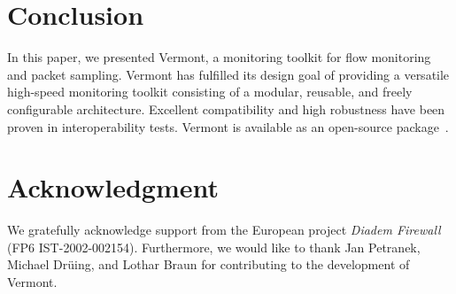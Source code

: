 

\section{Conclusion}
\label{sec:conclusion}

In this paper, we presented Vermont, a monitoring toolkit for flow monitoring and packet sampling.
Vermont has fulfilled its design goal of providing a versatile high-speed monitoring toolkit consisting of a modular, reusable, and freely configurable architecture. Excellent compatibility and high robustness have been proven in interoperability tests.
Vermont is available as an open-source package~\cite{vermont-site}.


\section*{Acknowledgment}
We gratefully acknowledge support from the European project \emph{Diadem Firewall} (FP6 IST-2002-002154). 
Furthermore, we would like to thank Jan Petranek, Michael Dr\"uing, and Lothar Braun for contributing to the development of Vermont.


